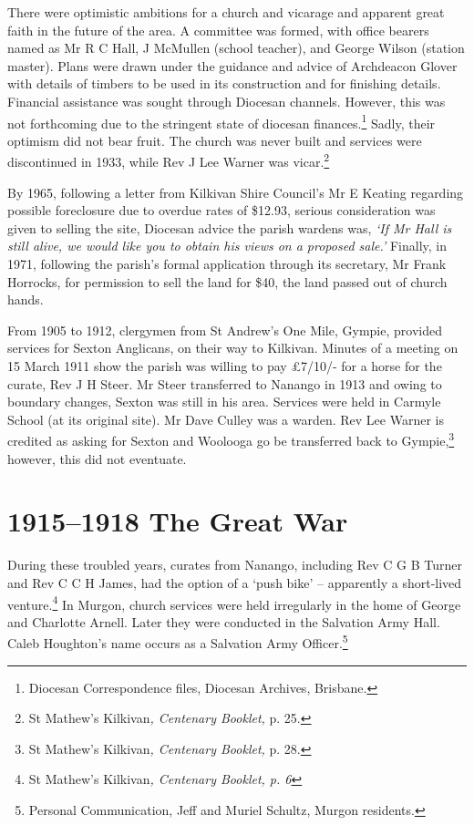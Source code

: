 There were optimistic ambitions for a church and vicarage and apparent great faith in the future of the area. A committee was formed, with office bearers named as Mr R C Hall, J McMullen (school teacher), and George Wilson (station master). Plans were drawn under the guidance and advice of Archdeacon Glover with details of timbers to be used in its construction and for finishing details. Financial assistance was sought through Diocesan channels. However, this was not forthcoming due to the stringent state of diocesan finances.\footnote{Diocesan Correspondence files, Diocesan Archives, Brisbane.} Sadly, their optimism did not bear fruit. The church was never built and services were discontinued in 1933, while Rev J Lee Warner was vicar.\footnote{St Mathew's Kilkivan\emph{, Centenary Booklet,} p. 25.}

By 1965, following a letter from Kilkivan Shire Council's Mr E Keating regarding possible foreclosure due to overdue rates of \$12.93, serious consideration was given to selling the site, Diocesan advice the parish wardens was, \emph{`If Mr Hall is still alive, we would like you to obtain his views on a proposed sale.'} Finally, in 1971, following the parish's formal application through its secretary, Mr Frank Horrocks, for permission to sell the land for \$40, the land passed out of church hands.

From 1905 to 1912, clergymen from St Andrew's One Mile, Gympie, provided services for Sexton Anglicans, on their way to Kilkivan. Minutes of a meeting on 15 March 1911 show the parish was willing to pay £7/10/- for a horse for the curate, Rev J H Steer. Mr Steer transferred to Nanango in 1913 and owing to boundary changes, Sexton was still in his area. Services were held in Carmyle School (at its original site). Mr Dave Culley was a warden. Rev Lee Warner is credited as asking for Sexton and Woolooga go be transferred back to Gympie,\footnote{St Mathew's Kilkivan\emph{, Centenary Booklet,} p. 28.} however, this did not eventuate.

\hypertarget{the-great-war}{%
\section{1915--1918 The Great War}\label{the-great-war}}

During these troubled years, curates from Nanango, including Rev C G B Turner and Rev C C H James, had the option of a `push bike' -- apparently a short-lived venture.\footnote{St Mathew's Kilkivan\emph{, Centenary Booklet, p. 6}} In Murgon, church services were held irregularly in the home of George and Charlotte Arnell. Later they were conducted in the Salvation Army Hall. Caleb Houghton's name occurs as a Salvation Army Officer.\footnote{Personal Communication, Jeff and Muriel Schultz, Murgon residents.}

